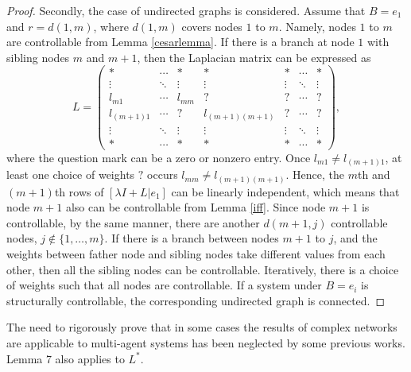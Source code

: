 \documentclass[a4paper,11pt]{article}
\begin{document}
{\begin{proof}
  Secondly, the case of undirected graphs is considered. Assume that $B=e_1$ and $r=d(1,m)$, where $d(1,m)$ covers nodes $1$ to $m$. Namely, nodes $1$ to $m$ are controllable from Lemma \ref{cesarlemma}. If there is a branch at node $1$ with sibling nodes $m$ and $m+1$, then the Laplacian matrix can be expressed as
\begin{equation*}
 L=\left( {\begin{array}{*{20}{c}}
*& \cdots &*&*&*& \cdots &*\\
 \vdots & \ddots & \vdots & \vdots & \vdots & \ddots & \vdots \\
{{l_{m1}}}& \cdots &{{l_{mm}}}&?&?& \cdots &?\\
{{l_{(m + 1)1}}}& \cdots &?&{{l_{(m + 1)(m + 1)}}}&?& \cdots &?\\
 \vdots & \ddots & \vdots & \vdots & \vdots & \ddots & \vdots \\
*& \cdots &*&*&*& \cdots &*
\end{array}} \right),
\end{equation*}
where the question mark can be a zero or nonzero entry. Once $l_{m1}\ne l_{(m+1)1}$, at least one choice of weights $?$ occurs $l_{mm}\ne l_{(m+1)(m+1)}$. Hence, the $m$th and $(m+1)$th rows of $[\lambda I+L|e_1]$ can be linearly independent, which means that node $m+1$ also can be controllable from Lemma \ref{iff}. Since node $m+1$ is controllable, by the same manner, there are another $d(m+1,j)$ controllable nodes, $j\notin\{1,\ldots,m\}$. If there is a branch between nodes $m+1$ to $j$, and the weights between father node and sibling nodes take different values from each other, then all the sibling nodes can be controllable. Iteratively, there is a choice of weights such that all nodes are controllable. If a system under $B=e_i$ is structurally controllable, the corresponding undirected graph is connected.
\end{proof}
\begin{remark}\label{point}
The need to rigorously prove that in some cases the results of complex networks are applicable to multi-agent systems has been neglected by some previous works. Lemma 7 also applies to $L^*$.
\end{remark}
}
\end{document}
